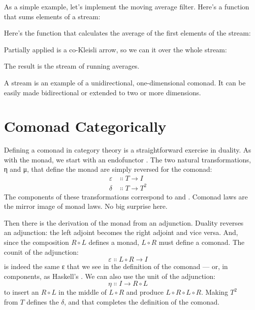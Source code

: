 As a simple example, let's implement the moving average filter. Here's a
function that sums  elements of a stream:

Here's the function that calculates the average of the first 
elements of the stream:

Partially applied  is a co-Kleisli arrow, so we can
 it over the whole stream:

The result is the stream of running averages.

A stream is an example of a unidirectional, one-dimensional comonad. It
can be easily made bidirectional or extended to two or more dimensions.

\section{Comonad Categorically}

Defining a comonad in category theory is a straightforward exercise in
duality. As with the monad, we start with an endofunctor . The
two natural transformations, η and μ, that define the monad are simply
reversed for the comonad:
\begin{align*}
\varepsilon &\Colon T \to I \\
\delta &\Colon T \to T^2
\end{align*}
The components of these transformations correspond to 
and . Comonad laws are the mirror image of monad laws.
No big surprise here.

Then there is the derivation of the monad from an adjunction. Duality
reverses an adjunction: the left adjoint becomes the right adjoint and
vice versa. And, since the composition $R \circ L$ defines a monad,
$L \circ R$ must define a comonad. The counit of the adjunction:
\[\varepsilon \Colon L \circ R \to I\]
is indeed the same ε that we see in the definition of the comonad ---
or, in components, as Haskell's . We can also use the
unit of the adjunction:
\[\eta \Colon I \to R \circ L\]
to insert an $R \circ L$ in the middle of $L \circ R$ and
produce $L \circ R \circ L \circ R$. Making $T^2$ from $T$
defines the $\delta$, and that completes the definition of the comonad.

